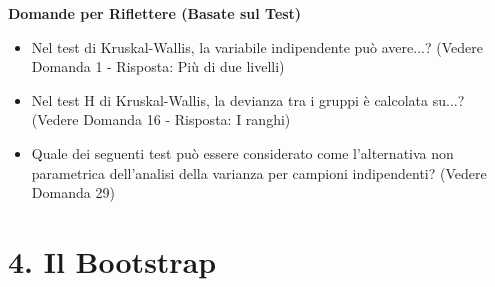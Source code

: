 \documentclass[12pt, a4paper]{article}
\newenvironment{reflectionbox}{%
    \medskip
    \begin{framed}\par\noindent
    \textbf{\color{boxtitlecolor}Domande per Riflettere (Basate sul Test)} \par
    \begin{itemize}[leftmargin=*, label=$\blacktriangleright$]
}{%
    \end{itemize}\par
    \end{framed}
    \medskip
}
\begin{document}
\begin{reflectionbox}
    \item Nel test di Kruskal-Wallis, la variabile indipendente può avere...? (Vedere Domanda 1 - Risposta: Più di due livelli)
    \item Nel test H di Kruskal-Wallis, la devianza tra i gruppi è calcolata su...? (Vedere Domanda 16 - Risposta: I ranghi)
    \item Quale dei seguenti test può essere considerato come l'alternativa non parametrica dell'analisi della varianza per campioni indipendenti? (Vedere Domanda 29)
\end{reflectionbox}

\section*{4. Il Bootstrap}
\end{document}
